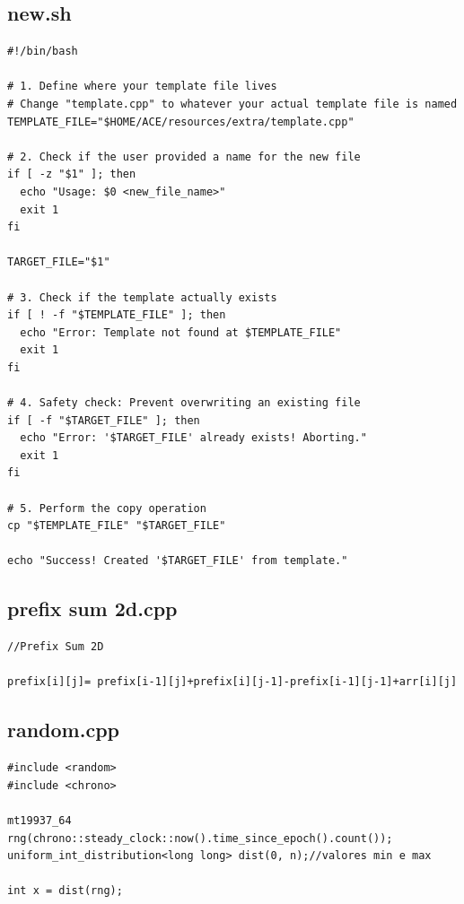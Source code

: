 \documentclass[11pt, a4paper, twoside]{article}
\begin{document}
\subsection{new.sh}
\begin{lstlisting}
#!/bin/bash

# 1. Define where your template file lives
# Change "template.cpp" to whatever your actual template file is named
TEMPLATE_FILE="$HOME/ACE/resources/extra/template.cpp"

# 2. Check if the user provided a name for the new file
if [ -z "$1" ]; then
  echo "Usage: $0 <new_file_name>"
  exit 1
fi

TARGET_FILE="$1"

# 3. Check if the template actually exists
if [ ! -f "$TEMPLATE_FILE" ]; then
  echo "Error: Template not found at $TEMPLATE_FILE"
  exit 1
fi

# 4. Safety check: Prevent overwriting an existing file
if [ -f "$TARGET_FILE" ]; then
  echo "Error: '$TARGET_FILE' already exists! Aborting."
  exit 1
fi

# 5. Perform the copy operation
cp "$TEMPLATE_FILE" "$TARGET_FILE"

echo "Success! Created '$TARGET_FILE' from template."
\end{lstlisting}

\subsection{prefix sum 2d.cpp}
\begin{lstlisting}
//Prefix Sum 2D

prefix[i][j]= prefix[i-1][j]+prefix[i][j-1]-prefix[i-1][j-1]+arr[i][j]

\end{lstlisting}

\subsection{random.cpp}
\begin{lstlisting}
#include <random>
#include <chrono>

mt19937_64 rng(chrono::steady_clock::now().time_since_epoch().count());
uniform_int_distribution<long long> dist(0, n);//valores min e max

int x = dist(rng);
\end{lstlisting}
\end{document}
